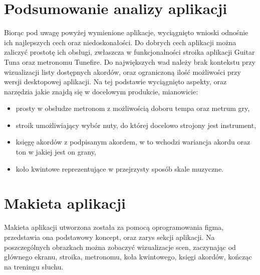 \section{Podsumowanie analizy aplikacji}

Biorąc pod uwagę powyżej wymienione aplikacje, wyciągnięto wnioski odnośnie ich najlepszych cech oraz niedoskonałości. Do dobrych cech aplikacji można zaliczyć prostotę ich obsługi, zwłaszcza w funkcjonalności stroika aplikacji Guitar Tuna oraz metronomu Tunefire. Do największych wad należy brak kontekstu przy wizualizacji listy dostępnych akordów, oraz ograniczoną ilość możliwości przy wersji desktopowej aplikacji. Na tej podstawie wyciągnięto aspekty, oraz narzędzia jakie znajdą się w docelowym produkcie, mianowicie:

\begin{itemize}
	\item prosty w obsłudze metronom z możliwością doboru tempa oraz metrum gry,
	\item stroik umożliwiający wybór nuty, do której docelowo strojony jest instrument,
	\item księgę akordów z podpisanym akordem, w to wchodzi wariancja akordu oraz ton w jakiej jest on grany,
	\item koło kwintowe reprezentujące w przejrzysty sposób skale muzyczne.
\end{itemize}

\section{Makieta aplikacji}

Makieta aplikacji utworzona została za pomocą oprogramowania figma, przedstawia ona podstawowy koncept, oraz zarys sekcji aplikacji. Na poszczególnych obrazkach można zobaczyć wizualizacje scen, zaczynając od głównego ekranu, stroika, metronomu, koła kwintowego, księgi akordów, kończąc na treningu słuchu. 



